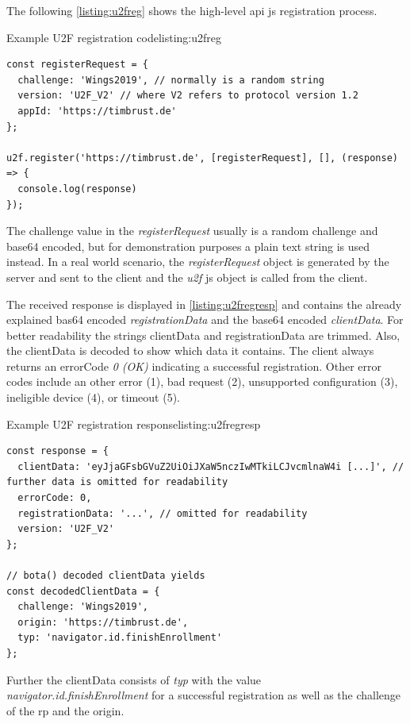 The following \autoref{listing:u2freg} shows the high-level \gls{api} \gls{js} registration process.
\\
\begin{example}{Example U2F registration code}{listing:u2freg}
\begin{verbatim}
const registerRequest = {
  challenge: 'Wings2019', // normally is a random string
  version: 'U2F_V2' // where V2 refers to protocol version 1.2
  appId: 'https://timbrust.de'
};

u2f.register('https://timbrust.de', [registerRequest], [], (response) => {
  console.log(response)
});
\end{verbatim}
\end{example}

The challenge value in the \textit{registerRequest} usually is a random challenge and base64 encoded, but for demonstration purposes a plain text string is used instead. In a real world scenario, the \textit{registerRequest} object is generated by the server and sent to the client and the \textit{u2f} \gls{js} object is called from the client.

The received response is displayed in \autoref{listing:u2fregresp} and contains the already explained bas64 encoded \textit{registrationData} and the base64 encoded \textit{clientData}. For better readability the strings clientData and registrationData are trimmed. Also, the clientData is decoded to show which data it contains. The client always returns an errorCode \textit{0 (OK)} indicating a successful registration. Other error codes include an other error (1), bad request (2), unsupported configuration (3), ineligible device (4), or timeout (5).

\begin{example}{Example U2F registration response}{listing:u2fregresp}
\begin{verbatim}
const response = {
  clientData: 'eyJjaGFsbGVuZ2UiOiJXaW5nczIwMTkiLCJvcmlnaW4i [...]', // further data is omitted for readability
  errorCode: 0,
  registrationData: '...', // omitted for readability
  version: 'U2F_V2'
};

// bota() decoded clientData yields
const decodedClientData = {
  challenge: 'Wings2019',
  origin: 'https://timbrust.de',
  typ: 'navigator.id.finishEnrollment'
};
\end{verbatim}
\end{example}

Further the clientData consists of \textit{typ} with the value \textit{navigator.id.finishEnrollment} for a successful registration as well as the challenge of the \gls{rp} and the origin.

